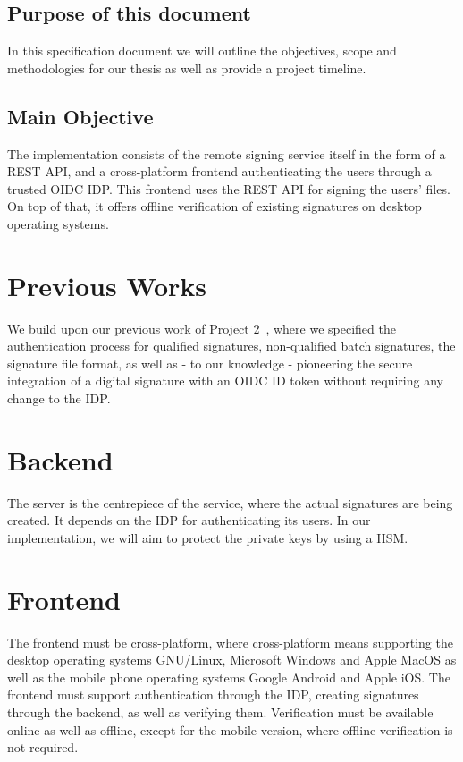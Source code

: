 \subsection{Purpose of this document}

In this specification document we will outline the objectives, scope and methodologies for our thesis as well as provide a project timeline.

\subsection{Main Objective}
The implementation consists of the remote signing service itself in the form of a \gls{REST} \gls{API},
and a cross-platform frontend authenticating the users through a trusted \gls{OIDC} \gls{IDP}.
This frontend uses the \gls{REST} \gls{API} for signing the users' files.
On top of that, it offers offline verification of existing signatures on desktop operating systems.

\section{Previous Works}
\label{section:previousworks}

We build upon our previous work of Project 2~\cite{projekt2}, where we specified the authentication process
for qualified signatures, non-qualified batch signatures, the signature file format,
as well as - to our knowledge - pioneering the secure integration of a digital signature with an \gls{OIDC} ID token without requiring any change to the \gls{IDP}.

\section{Backend}
\label{section:backend}

The server is the centrepiece of the service, where the actual signatures are being created.
It depends on the \gls{IDP} for authenticating its users.
In our implementation, we will aim to protect the private keys by using a \gls{HSM}.

\section{Frontend}
\label{section:frontend}

The frontend must be cross-platform, where cross-platform means supporting the desktop operating systems
GNU/Linux, Microsoft Windows and Apple MacOS as well as the mobile phone operating systems Google Android and Apple iOS.
The frontend must support authentication through the \gls{IDP}, creating signatures through the backend, as well as verifying them.
Verification must be available online as well as offline, except for the mobile version, where offline verification is not required.


